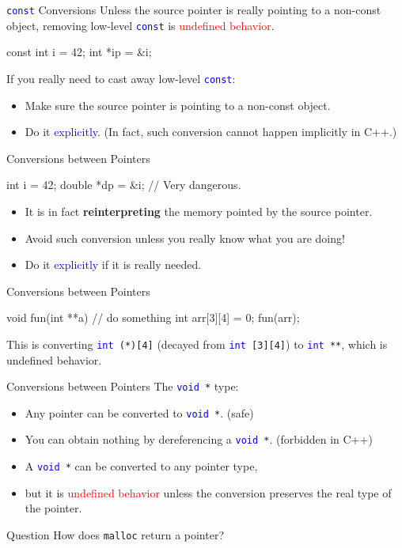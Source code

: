 \documentclass[handout]{beamer}
\newcommand{\red}[1]{\textcolor{red}{#1}}
\newcommand{\blue}[1]{\textcolor{blue}{#1}}
\newcommand{\ttt}[1]{\texttt{#1}}
\newcommand{\bluett}[1]{\blue{\ttt{#1}}}
\newenvironment{question}{\begin{alertblock}{Question}}{\end{alertblock}}
\theoremstyle{definition}
\begin{document}
\begin{frame}[fragile]{\bluett{const} Conversions}
    Unless the source pointer is really pointing to a non-const object, removing low-level \bluett{const} is \red{undefined behavior}.
    \begin{cpp}
const int i = 42;
int *ip = &i;
    \end{cpp}
    \pause
    If you really need to cast away low-level \bluett{const}:
    \begin{itemize}
        \item Make sure the source pointer is pointing to a non-const object.
        \item Do it \blue{explicitly}. (In fact, such conversion cannot happen implicitly in C++.)
    \end{itemize}
\end{frame}

\begin{frame}[fragile]{Conversions between Pointers}
    \begin{cpp}
int i = 42;
double *dp = &i; // Very dangerous.
    \end{cpp}
    \begin{itemize}
        \item It is in fact \textbf{reinterpreting} the memory pointed by the source pointer.
        \item Avoid such conversion unless you really know what you are doing!
        \item Do it \blue{explicitly} if it is really needed.
    \end{itemize}
\end{frame}

\begin{frame}[fragile]{Conversions between Pointers}
    \begin{cpp}
void fun(int **a) {
  // do something
}
int arr[3][4] = {0};
fun(arr);
    \end{cpp}
    This is converting \bluett{int }\ttt{(*)[4]} (decayed from \bluett{int }\ttt{[3][4]}) to \bluett{int }\ttt{**}, which is undefined behavior.
\end{frame}

\begin{frame}{Conversions between Pointers}
    The \bluett{void }\ttt{*} type:
    \begin{itemize}
        \item Any pointer can be converted to \bluett{void }\ttt{*}. (safe)
        \item You can obtain nothing by dereferencing a \bluett{void }\ttt{*}. (forbidden in C++)
        \pause
        \item A \bluett{void }\ttt{*} can be converted to any pointer type,
        \item but it is \red{undefined behavior} unless the conversion preserves the real type of the pointer.
    \end{itemize}
    \pause
    \begin{question}
        How does \ttt{malloc} return a pointer?
    \end{question}
\end{frame}
\end{document}
